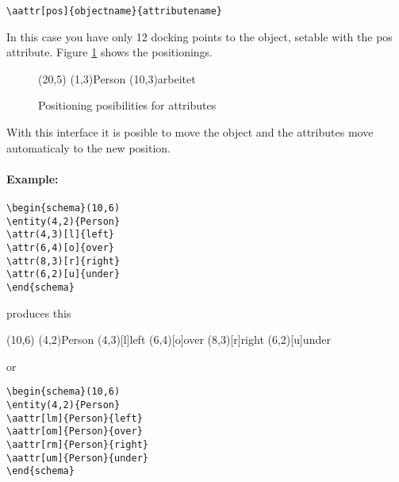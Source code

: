 \documentclass[a4paper,11pt]{article}
\begin{document}
\begin{verbatim}
\aattr[pos]{objectname}{attributename}
\end{verbatim}

In this case you have only 12 docking points to the object, setable with the pos attribute.
Figure \ref{fig:attr_pos} shows the positionings.

\begin{figure}[htb]
  \centering
  \begin{schema}(20,5)
  \entity(1,3){Person}
  \relation(10,3){arbeitet}
\end{schema}

  \caption{Positioning posibilities for attributes}
  \label{fig:attr_pos}
\end{figure}

With this interface it is posible to move the object and the attributes
move automaticaly to the new position.

\paragraph{Example:}

\begin{verbatim}
\begin{schema}(10,6)
\entity(4,2){Person}
\attr(4,3)[l]{left}
\attr(6,4)[o]{over}
\attr(8,3)[r]{right}
\attr(6,2)[u]{under}
\end{schema}
\end{verbatim}

produces this

\begin{schema}(10,6)
\entity(4,2){Person}
\attr(4,3)[l]{left}
\attr(6,4)[o]{over}
\attr(8,3)[r]{right}
\attr(6,2)[u]{under}
\end{schema}

or

\begin{verbatim}
\begin{schema}(10,6)
\entity(4,2){Person}
\aattr[lm]{Person}{left}
\aattr[om]{Person}{over}
\aattr[rm]{Person}{right}
\aattr[um]{Person}{under}
\end{schema}
\end{verbatim}
\end{document}
